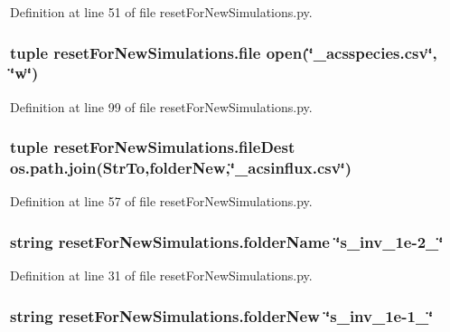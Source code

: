Definition at line 51 of file reset\-For\-New\-Simulations.\-py.

\hypertarget{namespacereset_for_new_simulations_a3caa9a656a250a12f7112582bde03381}{
\subsubsection[{file}]{\setlength{\rightskip}{0pt plus 5cm}tuple reset\-For\-New\-Simulations.\-file open(\char`\"{}\-\_\-acsspecies.\-csv\char`\"{}, \char`\"{}w\char`\"{})}}\label{namespacereset_for_new_simulations_a3caa9a656a250a12f7112582bde03381}


Definition at line 99 of file reset\-For\-New\-Simulations.\-py.

\hypertarget{namespacereset_for_new_simulations_a0fd24d58ef8ebf1029176f620ce7fe65}{
\subsubsection[{file\-Dest}]{\setlength{\rightskip}{0pt plus 5cm}tuple reset\-For\-New\-Simulations.\-file\-Dest os.\-path.\-join(Str\-To,{\bf folder\-New},\char`\"{}\-\_\-acsinflux.\-csv\char`\"{})}}\label{namespacereset_for_new_simulations_a0fd24d58ef8ebf1029176f620ce7fe65}


Definition at line 57 of file reset\-For\-New\-Simulations.\-py.

\hypertarget{namespacereset_for_new_simulations_af9fbda1c8e6d13404f0224a5b3ef16fe}{
\subsubsection[{folder\-Name}]{\setlength{\rightskip}{0pt plus 5cm}string reset\-For\-New\-Simulations.\-folder\-Name \char`\"{}s\-\_\-inv\-\_\-1e-\/2\-\_\-\char`\"{}}}\label{namespacereset_for_new_simulations_af9fbda1c8e6d13404f0224a5b3ef16fe}


Definition at line 31 of file reset\-For\-New\-Simulations.\-py.

\hypertarget{namespacereset_for_new_simulations_adfad2b3e8459d644a442c254865c564b}{
\subsubsection[{folder\-New}]{\setlength{\rightskip}{0pt plus 5cm}string reset\-For\-New\-Simulations.\-folder\-New \char`\"{}s\-\_\-inv\-\_\-1e-\/1\-\_\-\char`\"{}}}\label{namespacereset_for_new_simulations_adfad2b3e8459d644a442c254865c564b}


